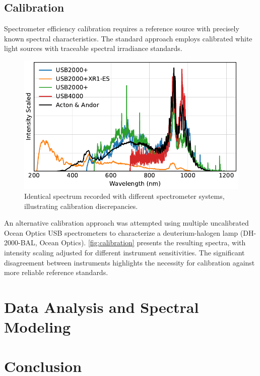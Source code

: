 \documentclass[
	parskip=half,
	a4paper,
]{scrarticle}
\begin{document}
\subsection{Calibration}

Spectrometer efficiency calibration requires a reference source with precisely known spectral characteristics. The standard approach employs calibrated white light sources with traceable spectral irradiance standards.

\begin{figure}[hb]
    \centering
    \includegraphics{../analysis/figures/efficiency_different.pdf}
    \caption{Identical spectrum recorded with different spectrometer systems, illustrating calibration discrepancies.}
    \label{fig:calibration}
\end{figure}

An alternative calibration approach was attempted using multiple uncalibrated Ocean Optics USB spectrometers to characterize a deuterium-halogen lamp (DH-2000-BAL, Ocean Optics). \autoref{fig:calibration} presents the resulting spectra, with intensity scaling adjusted for different instrument sensitivities. The significant disagreement between instruments highlights the necessity for calibration against more reliable reference standards.


\clearpage
\section{Data Analysis and Spectral Modeling}

\clearpage
\section{Conclusion}

\clearpage
\printbibliography
\end{document}
